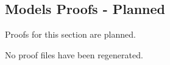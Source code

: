 \subsection*{Models Proofs - Planned}

Proofs for this section are planned.

No proof files have been regenerated.

